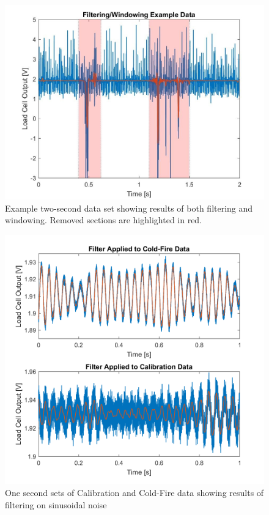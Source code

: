 \documentclass[journal]{IEEEtran}
\begin{document}
\begin{figure}
  \includegraphics[width=\linewidth]{figs/raw-data.jpg}
  \caption{Example two-second data set showing results of both filtering and windowing. Removed sections are highlighted in red.}
\label{fig:raw-data}
\end{figure}

\begin{figure}
  \includegraphics[width=\linewidth]{figs/other-raw-data.png}
  \caption{One second sets of Calibration and Cold-Fire data showing results of filtering on sinusoidal noise}
\label{fig:other-raw-data}
\end{figure}
\end{document}
